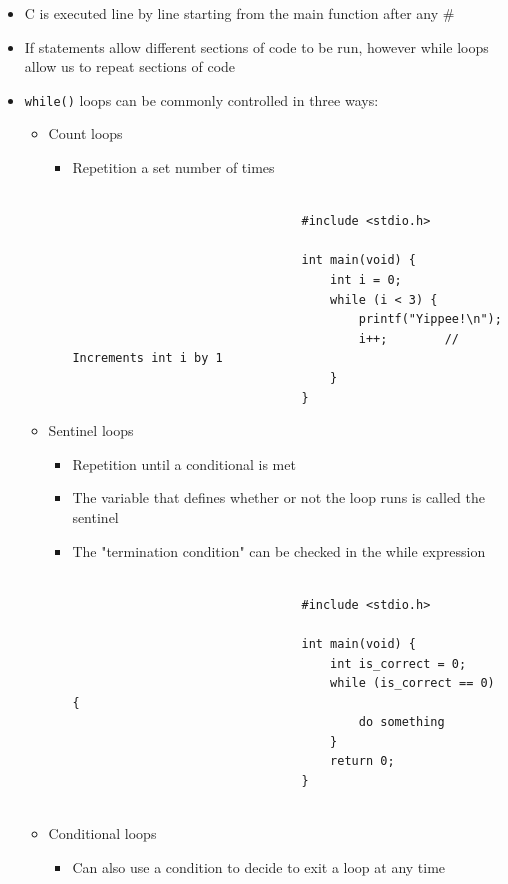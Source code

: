 \documentclass{article}
\begin{document}
		\begin{itemize}
			\item C is executed line by line starting from the main function after any #
			\item If statements allow different sections of code to be run, however while loops allow us to repeat sections of code
			\item \texttt{while()} loops can be commonly controlled in three ways:
				\begin{itemize}
					\item Count loops
						\begin{itemize}
							\item Repetition a set number of times

							\begin{verbatim}

								#include <stdio.h>

								int main(void) {
									int i = 0;
									while (i < 3) {
										printf("Yippee!\n");
										i++;		// Increments int i by 1
									}
								}

							\end{verbatim}
						\end{itemize}

					\item Sentinel loops
						\begin{itemize}
							\item Repetition until a conditional is met
							\item The variable that defines whether or not the loop runs is called the sentinel
							\item The "termination condition" can be checked in the while expression

							\begin{verbatim}
								
								#include <stdio.h>

								int main(void) {
									int is_correct = 0;
									while (is_correct == 0) {
										do something
									}
									return 0;
								}
								
							\end{verbatim}
						\end{itemize}
					\item Conditional loops
						\begin{itemize}
							\item Can also use a condition to decide to exit a loop at any time
						\end{itemize}
				\end{itemize}
		\end{itemize}
\end{document}
